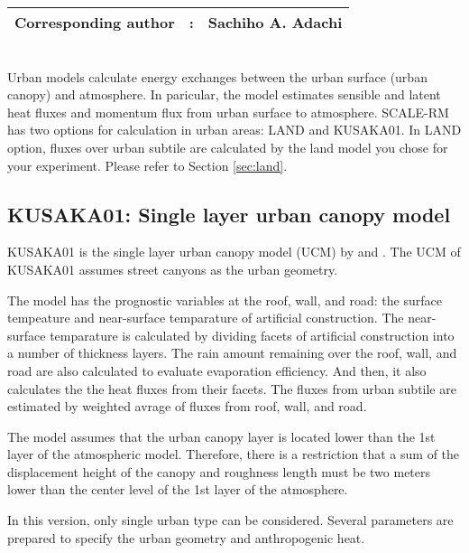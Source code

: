 {\bf \Large
\begin{tabular}{ccc}
\hline
  Corresponding author & : & Sachiho A. Adachi\\
\hline
\end{tabular}
}
\\


Urban models calculate energy exchanges between the urban surface (urban canopy) and atmosphere.
In paricular, the model estimates sensible and latent heat fluxes and momentum flux from urban surface to atmosphere.
SCALE-RM has two options for calculation in urban areas: LAND and KUSAKA01.
In LAND option, fluxes over urban subtile are calculated by the land model you chose for your experiment.
Please refer to Section \ref{sec:land}.

\subsection{KUSAKA01: Single layer urban canopy model}

KUSAKA01 is the single layer urban canopy model (UCM) by \citet{kusaka_2001} and \citet{kusaka_2004}.
The UCM of KUSAKA01 assumes street canyons as the urban geometry.

The model has the prognostic variables at the roof, wall, and road:
the surface tempeature and near-surface temparature of artificial construction.
The near-surface temparature is calculated by dividing facets of artificial construction into a number of thickness layers.
The rain amount remaining over the roof, wall, and road are also calculated to evaluate evaporation efficiency.
And then, it also calculates the the heat fluxes from their facets.
The fluxes from urban subtile are estimated by weighted avrage of fluxes from roof, wall, and road.

The model assumes that the urban canopy layer is located lower than the 1st layer of the atmospheric model.
Therefore, there is a restriction that a sum of the displacement height of the canopy and roughness length
must be two meters lower than the center level of the 1st layer of the atmosphere.

In this version, only single urban type can be considered.
Several parameters are prepared to specify the urban geometry and anthropogenic heat. 

